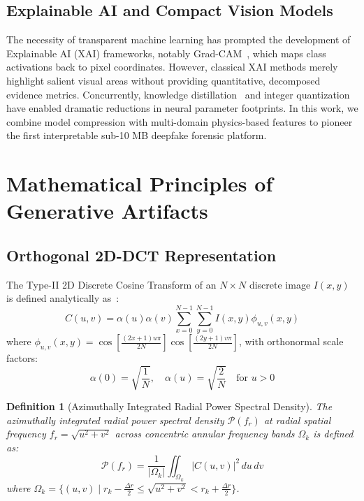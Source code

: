 \documentclass[journal]{IEEEtran}
\newtheorem{definition}{Definition}
\begin{document}
\subsection{Explainable AI and Compact Vision Models}
The necessity of transparent machine learning has prompted the development of Explainable AI (XAI) frameworks, notably Grad-CAM~\cite{selvaraju2017grad}, which maps class activations back to pixel coordinates. However, classical XAI methods merely highlight salient visual areas without providing quantitative, decomposed evidence metrics. Concurrently, knowledge distillation~\cite{hinton2015distilling} and integer quantization~\cite{jacob2018quantization} have enabled dramatic reductions in neural parameter footprints. In this work, we combine model compression with multi-domain physics-based features to pioneer the first interpretable sub-10 MB deepfake forensic platform.

\section{Mathematical Principles of Generative Artifacts}

\subsection{Orthogonal 2D-DCT Representation}
The Type-II 2D Discrete Cosine Transform of an $N \times N$ discrete image $I(x, y)$ is defined analytically as~\cite{oppenheim2009discrete}:
\begin{equation}
C(u, v) = \alpha(u) \alpha(v) \sum_{x=0}^{N-1} \sum_{y=0}^{N-1} I(x, y) \phi_{u, v}(x, y)
\end{equation}
where $\phi_{u, v}(x, y) = \cos\left[ \frac{(2x+1)u\pi}{2N} \right] \cos\left[ \frac{(2y+1)v\pi}{2N} \right]$, with orthonormal scale factors:
\begin{equation}
\alpha(0) = \sqrt{\frac{1}{N}}, \quad \alpha(u) = \sqrt{\frac{2}{N}} \quad \text{for } u > 0
\end{equation}

\begin{definition}[Azimuthally Integrated Radial Power Spectral Density]
The azimuthally integrated radial power spectral density $\mathcal{P}(f_r)$ at radial spatial frequency $f_r = \sqrt{u^2 + v^2}$ across concentric annular frequency bands $\Omega_k$ is defined as:
\begin{equation}
\mathcal{P}(f_r) = \frac{1}{|\Omega_k|} \iint_{\Omega_k} |C(u, v)|^2 \, du \, dv
\end{equation}
where $\Omega_k = \{(u, v) \mid r_k - \frac{\Delta r}{2} \le \sqrt{u^2 + v^2} < r_k + \frac{\Delta r}{2}\}$.
\end{definition}
\end{document}
